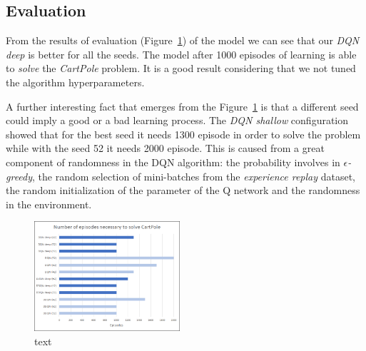 \subsection{Evaluation}

From the results of evaluation (Figure~\ref{fig:comparison}) of the model we can see that our \textit{DQN deep} is better for all the seeds. The model after 1000 episodes of learning is able to \textit{solve} the \textit{CartPole} problem. It is a good result considering that we not tuned the algorithm hyperparameters.

A further interesting fact that emerges from the Figure~\ref{fig:comparison} is that a different seed could imply a good or a bad learning process. The \textit{DQN shallow} configuration showed that for the best seed it needs 1300 episode in order to solve the problem while with the seed 52 it needs 2000 episode. This is caused from a great component of randomness in the DQN algorithm: the probability involves in \textit{$\epsilon$-greedy}, the random selection of mini-batches from the \textit{experience replay} dataset, the random initialization of the parameter of the Q network and the randomness in the environment.

\begin{figure}
	\centering
	\includegraphics[width=0.48\textwidth]{res/Comparison}
	\caption{text}
	\label{fig:comparison}
\end{figure}
